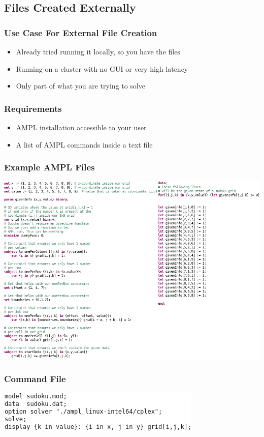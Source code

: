 \documentclass{beamer}
\begin{document}
    \subsection{Files Created Externally}
    \begin{frame}
        \frametitle{Use Case For External File Creation}
        \begin{itemize}
            \item Already tried running it locally, so you have the files
            \item Running on a cluster with no GUI or very high latency
            \item Only part of what you are trying to solve
        \end{itemize}
    \end{frame}
    \begin{frame}
        \frametitle{Requirements}
        \begin{itemize}
            \item AMPL installation accessible to your user
            \item A list of AMPL commands inside a text file
        \end{itemize}
    \end{frame}
    \begin{frame}
        \frametitle{Example AMPL Files}
        \includegraphics[width=\textwidth]{figures/presentationFile.png}
   \end{frame}
   \begin{frame}
        \frametitle{Command File}
        \includegraphics[width=\textwidth]{figures/sudokuCommand.png}
   \end{frame}
\end{document}
